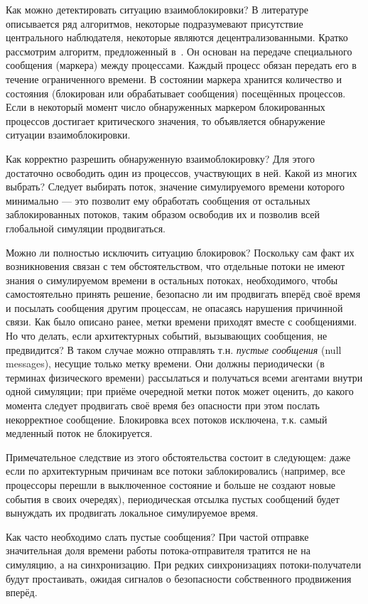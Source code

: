 Как можно детектировать ситуацию взаимоблокировки? В литературе описывается ряд алгоритмов, некоторые подразумевают присутствие центрального наблюдателя, некоторые являются децентрализованными. Кратко рассмотрим алгоритм, предложенный в~\cite{Misra86distributeddiscrete-event}. Он основан на  передаче специального сообщения (маркера) между процессами. Каждый процесс обязан передать его в течение ограниченного времени. В состоянии маркера хранится количество и состояния (блокирован или обрабатывает сообщения) посещённых процессов. Если в некоторый момент число обнаруженных маркером блокированных процессов достигает критического значения, то объявляется обнаружение ситуации взаимоблокировки.

Как корректно разрешить обнаруженную взаимоблокировку? Для этого достаточно освободить один из процессов, участвующих в ней. Какой из многих выбрать? Следует выбирать поток, значение симулируемого времени которого минимально — это позволит ему обработать сообщения от остальных заблокированных потоков, таким образом освободив их и позволив всей глобальной симуляции продвигаться. 

Можно ли полностью исключить ситуацию блокировок? Поскольку сам факт их возникновения связан с тем обстоятельством, что отдельные потоки не имеют знания о симулируемом времени в остальных потоках, необходимого, чтобы самостоятельно принять решение, безопасно ли им продвигать вперёд своё время и посылать сообщения другим процессам, не опасаясь нарушения причинной связи. Как было описано ранее, метки времени приходят вместе с сообщениями. Но что делать, если архитектурных событий, вызывающих сообщения, не предвидится? В таком случае можно отправлять т.н. \textit{пустые сообщения} (\abbr null messages), несущие только метку времени. Они должны периодически (в терминах физического времени) рассылаться и получаться всеми агентами внутри одной симуляции; при приёме очередной метки поток может оценить, до какого момента следует продвигать своё время без опасности при этом послать некорректное сообщение. Блокировка всех потоков исключена, т.к. самый медленный поток не блокируется.

Примечательное следствие из этого обстоятельства состоит в следующем: даже если по архитектурным причинам все потоки заблокировались (например, все процессоры перешли в выключенное состояние и больше не создают новые события в своих очередях), периодическая отсылка пустых сообщений будет вынуждать их продвигать локальное симулируемое время.

Как часто необходимо слать пустые сообщения? При частой отправке значительная доля времени работы потока-отправителя тратится не на симуляцию, а на синхронизацию. При редких синхронизациях потоки-получатели будут простаивать, ожидая сигналов о безопасности собственного продвижения вперёд.

